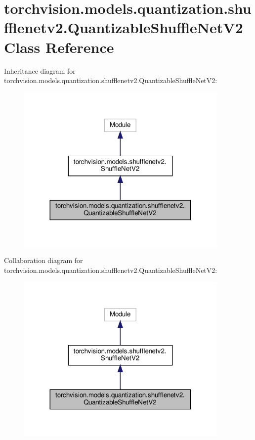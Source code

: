 \hypertarget{classtorchvision_1_1models_1_1quantization_1_1shufflenetv2_1_1QuantizableShuffleNetV2}{}\section{torchvision.\+models.\+quantization.\+shufflenetv2.\+Quantizable\+Shuffle\+Net\+V2 Class Reference}
\label{classtorchvision_1_1models_1_1quantization_1_1shufflenetv2_1_1QuantizableShuffleNetV2}


Inheritance diagram for torchvision.\+models.\+quantization.\+shufflenetv2.\+Quantizable\+Shuffle\+Net\+V2\+:
\nopagebreak
\begin{figure}[H]
\begin{center}
\leavevmode
\includegraphics[width=293pt]{classtorchvision_1_1models_1_1quantization_1_1shufflenetv2_1_1QuantizableShuffleNetV2__inherit__graph}
\end{center}
\end{figure}


Collaboration diagram for torchvision.\+models.\+quantization.\+shufflenetv2.\+Quantizable\+Shuffle\+Net\+V2\+:
\nopagebreak
\begin{figure}[H]
\begin{center}
\leavevmode
\includegraphics[width=293pt]{classtorchvision_1_1models_1_1quantization_1_1shufflenetv2_1_1QuantizableShuffleNetV2__coll__graph}
\end{center}
\end{figure}
